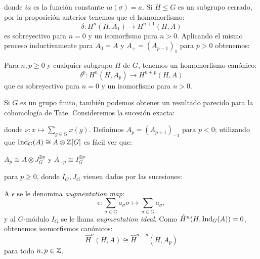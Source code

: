 \documentclass[a4paper,12pt, leqno]{article}
\begin{document}
donde $ia$ es la función constante $ia(\sigma)=a$. Si $H\leq G$ es un subgrupo cerrado, por la proposición anterior tenemos que el homomorfismo:
\begin{equation*}
\delta: H^n(H,A_1) \rightarrow H^{n+1}(H,A)
\end{equation*} 
es sobreyectivo para $n=0$ y un isomorfismo para $n>0$. Aplicando el mismo proceso inductivamente para $A_0 = A$ y $A_+=(A_{p-1})_1$ para $p>0$ obtenemos:
\begin{prop}\label{dimsh}
	Para $n,p \geq0$ y cualquier subgrupo $H$ de $G$, tenemos un homomorfismo canónico:\begin{equation*}
	\delta^p: H^n(H,A_p) \rightarrow H^{n+p}(H,A)
	\end{equation*}
	que es sobreyectivo para $n=0$ y un isomorfismo para $n>0$.
\end{prop}

Si $G$ es un grupo finito, también podemos obtener un resultado parecido para la cohomología de Tate. Consideremos la sucesión exacta:
\begin{center}
\end{center}
donde $\nu:x \mapsto \sum_{g \in G} x(g)$. Definimos $A_p=(A_{p+1})_{-1}$ para $p<0$; utilizando que $\mathrm{Ind}_G (A) \cong A \otimes \mathbb{Z}[G]$ es fácil ver que:
\begin{center}
	$A_p \cong A \otimes J_G^{\otimes p}$ y $A_{-p}\cong I_G^{\otimes p}$
\end{center}
para $p\geq 0$, donde $I_G,J_G$ vienen dados por las sucesiones:
\begin{center}
	\end{center}
A $\epsilon$ se le denomina \textit{augmentation map}:
\begin{equation*}
\epsilon: \sum_{\sigma \in G} a_{\sigma} \sigma \mapsto \sum_{\sigma \in G} a_{\sigma},
\end{equation*}
y al $G$-módulo $I_G$ se le llama \textit{augmentation ideal}. Como $\hat{H}^n(H,\mathrm{Ind}_G (A))=0$, obtenemos isomorfismos canónicos:
\begin{equation*}
\hat{H}^n(H,A)\cong \hat{H}^{n-p}(H,A_p)
\end{equation*}
para todo $n,p \in \mathbb{Z}$.
\end{document}
